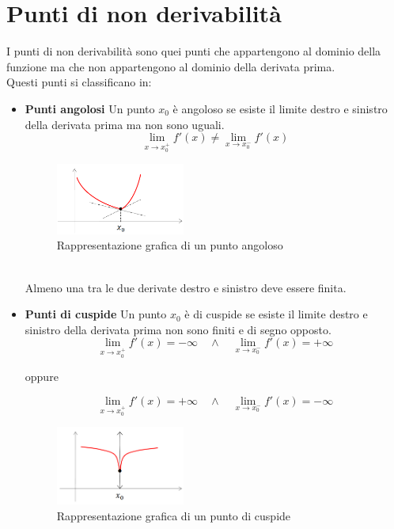 \documentclass{article}
\begin{document}
\section*{Punti di non derivabilità}
I punti di non derivabilità sono quei punti che appartengono al dominio della funzione ma che non appartengono al dominio della derivata prima.\\
Questi punti si classificano in:
\begin{itemize}
\item \textbf{Punti angolosi} Un punto $x_0$ è angoloso se esiste il limite destro e sinistro della derivata prima ma non sono uguali.\\
\[
    \lim_{x \to x_0^+} f'(x) \neq \lim_{x \to x_0^-} f'(x)
\]
\begin{figure}[h]
    \centering
    \includegraphics[width=0.4\textwidth]{angoloso.png}
    \caption{Rappresentazione grafica di un punto angoloso}
\end{figure}\\
Almeno una tra le due derivate destro e sinistro deve essere finita.
\newpage
\item \textbf{Punti di cuspide} Un punto $x_0$ è di cuspide se esiste il limite destro e sinistro della derivata prima non sono finiti e di segno opposto.\\
\[
    \lim_{x \to x_0^+} f'(x) = -\infty \quad \land \quad \lim_{x \to x_0^-} f'(x) = +\infty
\]
\begin{center}
    oppure
\end{center}
\[
    \lim_{x \to x_0^+} f'(x) = +\infty \quad \land \quad \lim_{x \to x_0^-} f'(x) = -\infty
\]
\begin{figure}[h]
\centering
\includegraphics[width=0.4\textwidth]{cuspide.png}
\caption{Rappresentazione grafica di un punto di cuspide}
\end{figure}\\

\end{itemize}
\end{document}
